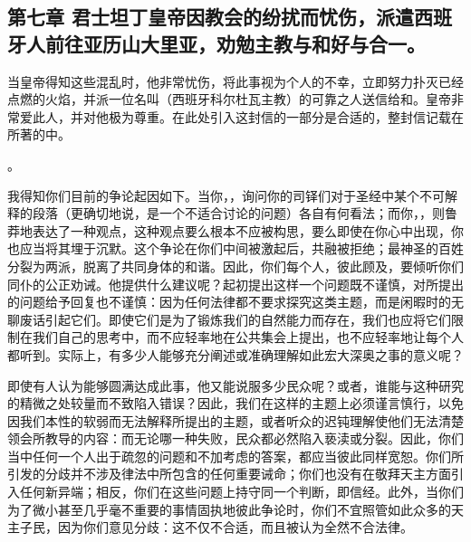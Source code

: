
\subsection{第七章 君士坦丁皇帝因教会的纷扰而忧伤，派遣西班牙人前往亚历山大里亚，劝勉主教与和好与合一。}

当皇帝得知这些混乱时，他非常忧伤，将此事视为个人的不幸，立即努力扑灭已经点燃的火焰，并派一位名叫（西班牙科尔杜瓦主教）的可靠之人送信给和。皇帝非常爱此人，并对他极为尊重。在此处引入这封信的一部分是合适的，整封信记载在所著的中。\par

。\par

我得知你们目前的争论起因如下。当你，，询问你的司铎们对于圣经中某个不可解释的段落（更确切地说，是一个不适合讨论的问题）各自有何看法；而你，，则鲁莽地表达了一种观点，这种观点要么根本不应被构思，要么即使在你心中出现，你也应当将其埋于沉默。这个争论在你们中间被激起后，共融被拒绝；最神圣的百姓分裂为两派，脱离了共同身体的和谐。因此，你们每个人，彼此顾及，要倾听你们同仆的公正劝诫。他提供什么建议呢？起初提出这样一个问题既不谨慎，对所提出的问题给予回复也不谨慎：因为任何法律都不要求探究这类主题，而是闲暇时的无聊废话引起它们。即使它们是为了锻炼我们的自然能力而存在，我们也应将它们限制在我们自己的思考中，而不应轻率地在公共集会上提出，也不应轻率地让每个人都听到。实际上，有多少人能够充分阐述或准确理解如此宏大深奥之事的意义呢？\par

即使有人认为能够圆满达成此事，他又能说服多少民众呢？或者，谁能与这种研究的精微之处较量而不致陷入错误？因此，我们在这样的主题上必须谨言慎行，以免因我们本性的软弱而无法解释所提出的主题，或者听众的迟钝理解使他们无法清楚领会所教导的内容：而无论哪一种失败，民众都必然陷入亵渎或分裂。因此，你们当中任何一个人出于疏忽的问题和不加考虑的答案，都应当彼此同样宽恕。你们所引发的分歧并不涉及律法中所包含的任何重要诫命；你们也没有在敬拜天主方面引入任何新异端；相反，你们在这些问题上持守同一个判断，即信经。此外，当你们为了微小甚至几乎毫不重要的事情固执地彼此争论时，你们不宜照管如此众多的天主子民，因为你们意见分歧：这不仅不合适，而且被认为全然不合法律。\par

